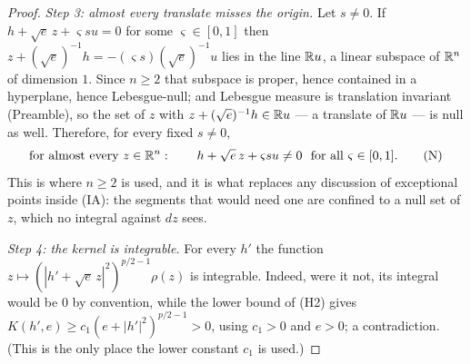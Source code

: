 \begin{proof}
\emph{Step 3: almost every translate misses the origin.}  Let $s\ne0$.  If
$h+\sqrt e\,z+\varsigma su=0$ for some $\varsigma\in[0,1]$ then
$z+(\sqrt e)^{-1}h=-(\varsigma s)(\sqrt e)^{-1}u$ lies in the line
$\mathbb{R} u$, a linear subspace of $\mathbb{R}^n$ of dimension $1$.  Since $n\ge2$ that
subspace is proper, hence contained in a hyperplane, hence Lebesgue-null; and
Lebesgue measure is translation invariant (Preamble), so the set of $z$ with
$z+(\sqrt e)^{-1}h\in\mathbb{R} u$ --- a translate of $\mathbb{R} u$ --- is null as well.  Therefore, for every fixed $s\ne0$,
\[
\text{for almost every }z\in\mathbb{R}^n:\qquad
h+\sqrt e\,z+\varsigma su\ne0\ \text{ for all }\varsigma\in[0,1].
\tag{N}
\]
This is where $n\ge2$ is used, and it is what replaces any discussion of
exceptional points inside (IA): the segments that would need one are confined to
a null set of $z$, which no integral against $dz$ sees.

\emph{Step 4: the kernel is integrable.}  For every $h'$ the function
$z\mapsto(|h'+\sqrt e\,z|^2)^{p/2-1}\rho(z)$ is integrable.  Indeed, were it
not, its integral would be $0$ by convention, while the lower bound of (H2)
gives $K(h',e)\ge c_1(e+|h'|^2)^{p/2-1}>0$, using $c_1>0$ and $e>0$; a
contradiction.  (This is the only place the lower constant $c_1$ is used.)


\end{proof}
